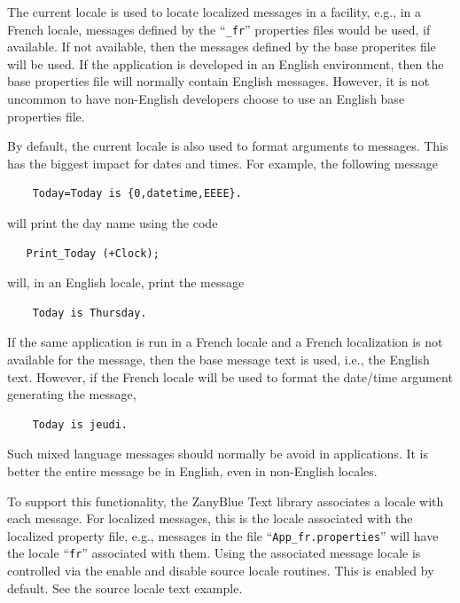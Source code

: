 The current locale is used to locate localized messages in a facility,
e.g., in a French locale, messages defined by the ``\texttt{\_fr}''
properties files would be used, if available.  If not available,
then the messages defined by the base properites file will be used.
If the application is developed in an English environment, then the base
properties file will normally contain English messages.  However, it is
not uncommon to have non-English developers choose to use an English
base properties file.

By default, the current locale is also used to format arguments to messages.
This has the biggest impact for dates and times.  For example, the following
message
\begin{small}
\begin{verbatim}
    Today=Today is {0,datetime,EEEE}.
\end{verbatim}
\end{small}
will print the day name using the code
\begin{small}
\begin{verbatim}
   Print_Today (+Clock);
\end{verbatim}
\end{small}
will, in an English locale, print the message
\begin{small}
\begin{verbatim}
    Today is Thursday.
\end{verbatim}
\end{small}

If the same application is run in a French locale and a French localization
is not available for the message, then the base message text is used, i.e.,
the English text.  However, if the French locale will be used to format the
date/time argument generating the message,
\begin{small}
\begin{verbatim}
    Today is jeudi.
\end{verbatim}
\end{small}

Such mixed language messages should normally be avoid in applications.  It
is better the entire message be in English, even in non-English locales.

To support this functionality, the ZanyBlue Text library associates a locale
with each message.  For localized messages, this is the locale associated with
the localized property file, e.g., messages in the file
``\texttt{App\_fr.properties}'' will have the locale ``\texttt{fr}'' associated
with them.  Using the associated message locale is controlled via the enable
and disable source locale routines.  This is enabled by default.  See the
source locale text example.

